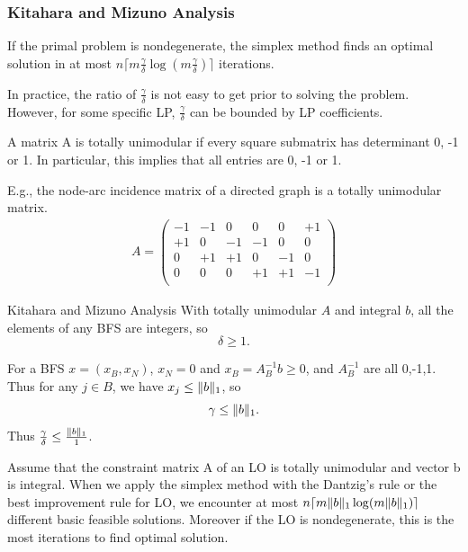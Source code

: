 \documentclass{beamer}
\DeclarePairedDelimiter{\norm}{\lVert}{\rVert}
\begin{document}
\begin{frame}
\frametitle{Kitahara and Mizuno Analysis}
\begin{corollary}
 If the primal problem is nondegenerate, the simplex method finds an optimal solution in at most $n\lceil m \frac{\gamma}{\delta}\log(m\frac{\gamma}{\delta})\rceil$ iterations.
\end{corollary}
In practice, the ratio of $\frac{\gamma}{\delta}$ is not easy to get prior to solving the problem. However, for some specific LP, $\frac{\gamma}{\delta}$ can be bounded by LP coefficients. 
\begin{definition}
A matrix A is totally unimodular if every square submatrix has determinant 0, -1 or 1. In particular, this implies that all entries are 0, -1 or 1.
\end{definition}
E.g., the node-arc incidence matrix of a directed graph is a totally unimodular matrix.
\begin{align*}
A = \begin{pmatrix}
-1 & -1& 0& 0& 0& +1\\
+1 & 0& -1& -1& 0& 0\\
0 & +1& +1& 0& -1& 0\\
0 & 0& 0& +1& +1& -1\\
\end{pmatrix}
\end{align*}
\end{frame}


\begin{frame}{Kitahara and Mizuno Analysis}
With totally unimodular $A$ and integral $b$, all the elements of any BFS are integers, so $$\delta \ge 1.$$ 

For a BFS $x = (x_B, x_N)$, $x_N = 0$ and $x_B = A_B^{-1}b \ge 0$, and $A_B^{-1}$ are all 0,-1,1. Thus for any $j \in B$, we have $x_j \le \norm{b}_1$, so $$\gamma \le \norm{b}_1.$$ Thus $\frac{\gamma}{\delta} \le \frac{\norm{b}_1}{1}$. 
\begin{corollary}
Assume that the constraint matrix A of an LO is totally unimodular and vector b is integral. When we apply the simplex method with the Dantzig's rule or the best improvement rule for LO, we encounter at most $n\lceil m \norm{b}_1\log(m\norm{b}_1)\rceil$ different basic feasible solutions. Moreover if the LO is nondegenerate, this is the most iterations to find optimal solution. 
\end{corollary}

\end{frame}
\end{document}

